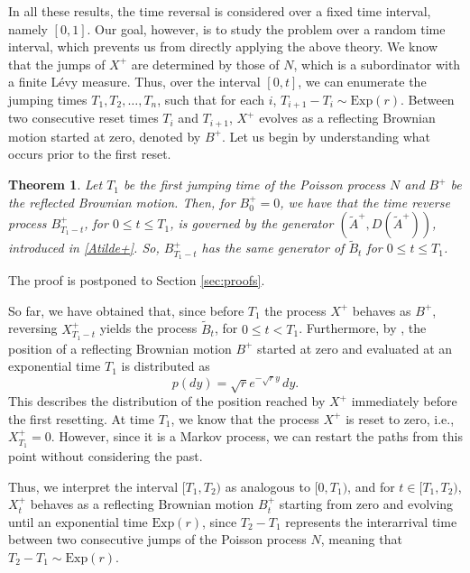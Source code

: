 \documentclass[11pt,a4paper]{article}
\newtheorem{theorem}{Theorem}
\theoremstyle{definition}
\theoremstyle{remark}
\begin{document}
In all these results, the time reversal is considered over a fixed time interval, namely \([0,1]\). Our goal, however, is to study the problem over a random time interval, which prevents us from directly applying the above theory. We know that the jumps of \(X^+\) are determined by those of \(N\), which is a subordinator with a finite L\'evy measure. Thus, over the interval \([0,t]\), we can enumerate the jumping times \(T_1, T_2, \dots, T_n\), such that for each \(i\), \(T_{i+1} - T_i \sim \text{Exp}(r)\).  Between two consecutive reset times \(T_i\) and \(T_{i+1}\), \(X^+\) evolves as a reflecting Brownian motion started at zero, denoted by \(B^+\). Let us begin by understanding what occurs prior to the first reset.
\begin{theorem}
	\label{thm:paths}
	Let \(T_1\) be the first jumping time of the Poisson process \(N\) and \(B^+\) be the reflected Brownian motion. Then, for \(B^+_0=0\), we have that the time reverse process \(B^+_{T_1 - t}\), for \(0 \leq t \leq T_1\), is governed by the generator \((\widetilde{A}^+, {D}(\widetilde{A}^+))\), introduced in \eqref{Atilde+}.
	So, \(B^+_{T_1-t}\) has the same generator of \(\widetilde{B}_t\) for \(0 \leq t \leq T_1\).
\end{theorem}
\noindent
The proof is postponed to Section \ref{sec:proofs}.


So far, we have obtained that, since before \( T_1 \) the process \( X^+ \) behaves as \( B^+ \), reversing \( X^+_{T_1 - t} \) yields the process \( \widetilde{B}_t \), for \(0\leq t < T_1\). Furthermore, by \cite[Formula 1.0.4, page 333]{BorodinSalminen}, the position of a reflecting Brownian motion \(B^+\) started at zero and evaluated at an exponential time \(T_1\) is distributed as  
\[
p(dy) = \sqrt{r} e^{-\sqrt{r} y} \, dy.
\]
This describes the distribution of the position reached by \(X^+\) immediately before the first resetting. At time \( T_1 \), we know that the process \( X^+ \) is reset to zero, i.e., \( X^+_{T_1} = 0 \). However, since it is a Markov process, we can restart the paths from this point without considering the past.  

Thus, we interpret the interval \([T_1, T_2)\) as analogous to \([0, T_1)\), and for \(t \in [T_1, T_2)\), \({X}^+_t\) behaves as a reflecting Brownian motion \(B^+_t\) starting from zero and evolving until an exponential time \( \text{Exp}(r) \), since \( T_2 - T_1 \) represents the interarrival time between two consecutive jumps of the Poisson process \( N \), meaning that \( T_2 - T_1 \sim \text{Exp}(r) \). 
\end{document}
